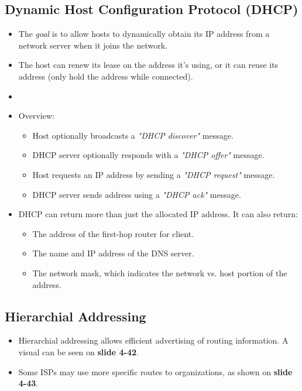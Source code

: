 \documentclass{article}
\begin{document}
\subsection{Dynamic Host Configuration Protocol (DHCP)}
\begin{itemize}
\item The \emph{goal} is to allow hosts to dynamically obtain its IP address from a network server when it joins the network.
\item The host can renew its lease on the address it's using, or it can reuse its address (only hold the address while connected).
\item \item Overview:
\begin{itemize}
\item Host optionally broadcasts a \emph{"DHCP discover"} message.
\item DHCP server optionally responds with a \emph{"DHCP offer"} message.
\item Host requests an IP address by sending a \emph{"DHCP request"} message.
\item DHCP server sends address using a \emph{"DHCP ack"} message.
\end{itemize}
\item DHCP can return more than just the allocated IP address. It can also return:
\begin{itemize}
\item The address of the first-hop router for client.
\item The name and IP address of the DNS server.
\item The network mask, which indicates the network vs. host portion of the address.
\end{itemize}
\end{itemize}

\subsection{Hierarchial Addressing}

\begin{itemize}
\item Hierarchial addressing allows efficient advertising of routing information. A visual can be seen on {\bf slide 4-42}.
\item Some ISPs may use more specific routes to organizations, as shown on {\bf slide 4-43}.
\end{itemize}
\end{document}
